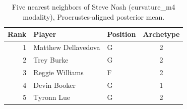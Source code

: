\begin{table}[htbp]
  \centering\small
  \begin{tabular}{rllc}
    \toprule
    Rank & Player & Position & Archetype \\
    \midrule
    1 & Matthew Dellavedova & G & 2 \\
    2 & Trey Burke & G & 2 \\
    3 & Reggie Williams & F & 2 \\
    4 & Devin Booker & G & 1 \\
    5 & Tyronn Lue & G & 2 \\
    \bottomrule
  \end{tabular}
  \caption{Five nearest neighbors of Steve Nash (curvature_m4 modality), Procrustes-aligned posterior mean.}
  \label{tab:Steve_Nash_neighbors_curvature_m4}
\end{table}


